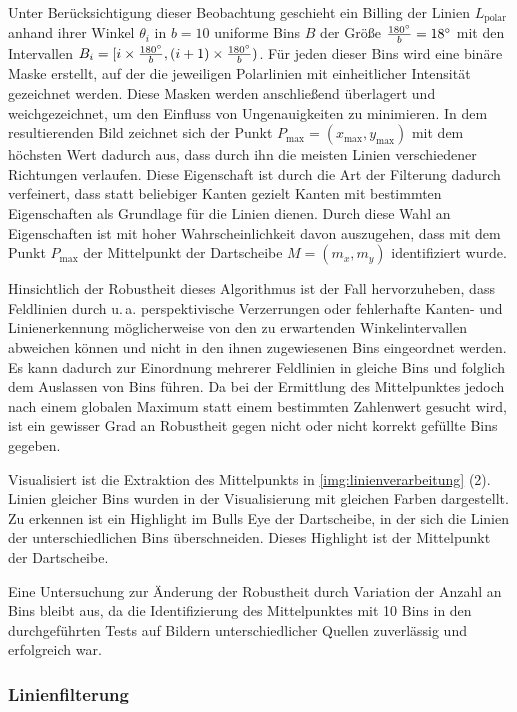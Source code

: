 Unter Berücksichtigung dieser Beobachtung geschieht ein Billing der Linien $L_\text{polar}$ anhand ihrer Winkel $\theta_i$ in $b=10$ uniforme Bins $B$ der Größe $\frac{180^{\circ}}{b}=18^{\circ}$ mit den Intervallen $ B_i = [i \times \frac{180^{\circ}}{b}, (i+1) \times \frac{180^{\circ}}{b})$. Für jeden dieser Bins wird eine binäre Maske erstellt, auf der die jeweiligen Polarlinien mit einheitlicher Intensität gezeichnet werden. Diese Masken werden anschließend überlagert und weichgezeichnet, um den Einfluss von Ungenauigkeiten zu minimieren. In dem resultierenden Bild zeichnet sich der Punkt $P_\text{max} = (x_\text{max}, y_\text{max})$ mit dem höchsten Wert dadurch aus, dass durch ihn die meisten Linien verschiedener Richtungen verlaufen. Diese Eigenschaft ist durch die Art der Filterung dadurch verfeinert, dass statt beliebiger Kanten gezielt Kanten mit bestimmten Eigenschaften als Grundlage für die Linien dienen. Durch diese Wahl an Eigenschaften ist mit hoher Wahrscheinlichkeit davon auszugehen, dass mit dem Punkt $P_\text{max}$ der Mittelpunkt der Dartscheibe $M=(m_x, m_y)$ identifiziert wurde.

Hinsichtlich der Robustheit dieses Algorithmus ist der Fall hervorzuheben, dass Feldlinien durch u.\,a. perspektivische Verzerrungen oder fehlerhafte Kanten- und Linienerkennung möglicherweise von den zu erwartenden Winkelintervallen abweichen können und nicht in den ihnen zugewiesenen Bins eingeordnet werden. Es kann dadurch zur Einordnung mehrerer Feldlinien in gleiche Bins und folglich dem Auslassen von Bins führen. Da bei der Ermittlung des Mittelpunktes jedoch nach einem globalen Maximum statt einem bestimmten Zahlenwert gesucht wird, ist ein gewisser Grad an Robustheit gegen nicht oder nicht korrekt gefüllte Bins gegeben.

Visualisiert ist die Extraktion des Mittelpunkts in \autoref{img:linienverarbeitung} (2). Linien gleicher Bins wurden in der Visualisierung mit gleichen Farben dargestellt. Zu erkennen ist ein Highlight im Bulls Eye der Dartscheibe, in der sich die Linien der unterschiedlichen Bins überschneiden. Dieses Highlight ist der Mittelpunkt der Dartscheibe.

Eine Untersuchung zur Änderung der Robustheit durch Variation der Anzahl an Bins bleibt aus, da die Identifizierung des Mittelpunktes mit 10 Bins in den durchgeführten Tests auf Bildern unterschiedlicher Quellen zuverlässig und erfolgreich war.

\subsubsection{Linienfilterung}
\label{sec:linienfilterung}

